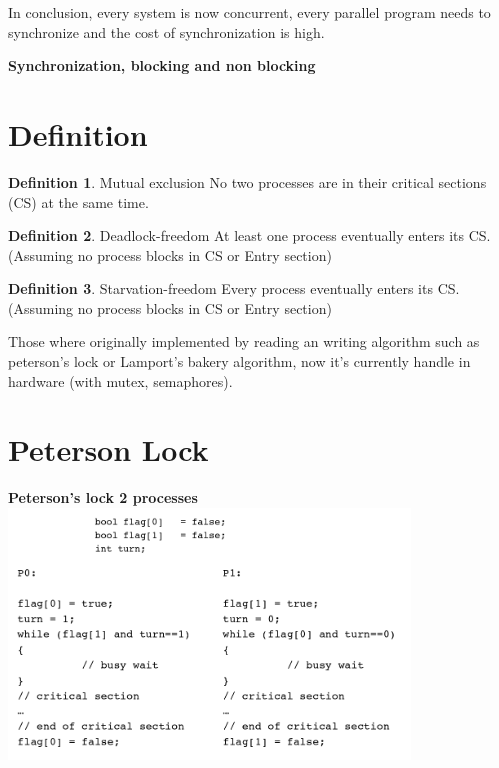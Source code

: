 \documentclass{article}
\theoremstyle{definition}
\newtheorem{definition}{Definition}[section]
\begin{document}
In conclusion, every system is now concurrent, every parallel program needs to synchronize and the cost of synchronization is high.

\vspace{0.5 cm}
{\Large \centering \textbf{Synchronization, blocking and non blocking}}
\vspace{-0.3 cm}

\section{Definition}

\begin{definition}{Mutual exclusion}
No two processes are in their critical sections (CS) at the same time.
\end{definition}

\begin{definition}{Deadlock-freedom}
At least one process eventually enters its CS. (Assuming no process blocks in CS or Entry section)
\end{definition}

\begin{definition}{Starvation-freedom}
Every process eventually enters its CS. (Assuming no process blocks in CS or Entry section)
\end{definition}

Those where originally implemented by reading an writing algorithm such as peterson's lock or  Lamport’s bakery algorithm, now it's currently handle in hardware (with mutex, semaphores).

\section{Peterson Lock}
\begin{center}
	\large{\textbf{Peterson's lock 2 processes}}\\
	\includegraphics[width=0.8\textwidth]{peterson}
\end{center}
\end{document}
